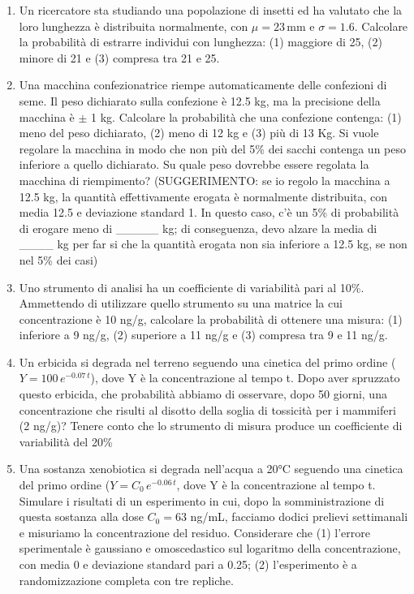 \documentclass[
  12pt,
]{book}
\providecommand{\tightlist}{%
  \setlength{\itemsep}{0pt}\setlength{\parskip}{0pt}}
\begin{document}
\begin{enumerate}
\def\labelenumi{\arabic{enumi}.}
\tightlist
\item
  Un ricercatore sta studiando una popolazione di insetti ed ha valutato che la loro lunghezza è distribuita normalmente, con \(\mu = 23 \, \textrm{mm}\) e \(\sigma = 1.6\). Calcolare la probabilità di estrarre individui con lunghezza: (1) maggiore di 25, (2) minore di 21 e (3) compresa tra 21 e 25.
\item
  Una macchina confezionatrice riempe automaticamente delle confezioni di seme. Il peso dichiarato sulla confezione è 12.5 kg, ma la precisione della macchina è \(\pm\) 1 kg. Calcolare la probabilità che una confezione contenga: (1) meno del peso dichiarato, (2) meno di 12 kg e (3) più di 13 Kg. Si vuole regolare la macchina in modo che non più del 5\% dei sacchi contenga un peso inferiore a quello dichiarato. Su quale peso dovrebbe essere regolata la macchina di riempimento? (SUGGERIMENTO: se io regolo la macchina a 12.5 kg, la quantità effettivamente erogata è normalmente distribuita, con media 12.5 e deviazione standard 1. In questo caso, c'è un 5\% di probabilità di erogare meno di \_\_\_\_\_ kg; di conseguenza, devo alzare la media di \_\_\_\_ kg per far si che la quantità erogata non sia inferiore a 12.5 kg, se non nel 5\% dei casi)
\item
  Uno strumento di analisi ha un coefficiente di variabilità pari al 10\%. Ammettendo di utilizzare quello strumento su una matrice la cui concentrazione è 10 ng/g, calcolare la probabilità di ottenere una misura: (1) inferiore a 9 ng/g, (2) superiore a 11 ng/g e (3) compresa tra 9 e 11 ng/g.
\item
  Un erbicida si degrada nel terreno seguendo una cinetica del primo ordine (\(Y = 100 \, e^{-0.07 \, t}\)), dove Y è la concentrazione al tempo t. Dopo aver spruzzato questo erbicida, che probabilità abbiamo di osservare, dopo 50 giorni, una concentrazione che risulti al disotto della soglia di tossicità per i mammiferi (2 ng/g)? Tenere conto che lo strumento di misura produce un coefficiente di variabilità del 20\%
\item
  Una sostanza xenobiotica si degrada nell'acqua a 20°C seguendo una cinetica del primo ordine (\(Y = C_0 \, e^{-0.06 \, t}\), dove Y è la concentrazione al tempo t. Simulare i risultati di un esperimento in cui, dopo la somministrazione di questa sostanza alla dose \(C_0 = 63\) ng/mL, facciamo dodici prelievi settimanali e misuriamo la concentrazione del residuo. Considerare che (1) l'errore sperimentale è gaussiano e omoscedastico sul logaritmo della concentrazione, con media 0 e deviazione standard pari a 0.25; (2) l'esperimento è a randomizzazione completa con tre repliche.

\end{enumerate}
\end{document}
